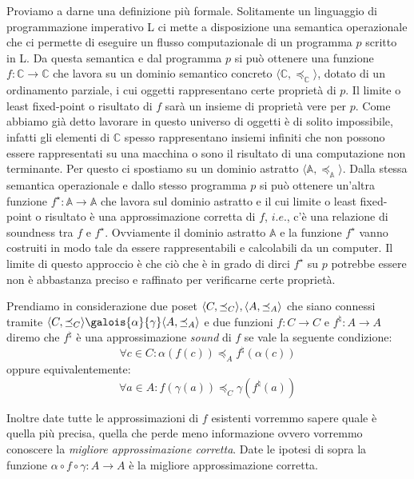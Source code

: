 Proviamo a darne una definizione più formale. Solitamente un linguaggio di programmazione imperativo L ci mette a disposizione una semantica operazionale che ci permette di eseguire un flusso computazionale di un programma \(p\) scritto in L. Da questa semantica e dal programma \(p\) si può ottenere una funzione \(f:\mathbb{C}\rightarrow\mathbb{C}\) che lavora su un dominio semantico concreto \(\langle\mathbb{C}, \preceq_{\mathbb{C}}\rangle\), dotato di un ordinamento parziale, i cui oggetti rappresentano certe proprietà di \(p\). Il limite o least fixed-point o risultato di \(f\) sarà un insieme di proprietà vere per \(p\). Come abbiamo già detto lavorare in questo universo di oggetti è di solito impossibile, infatti gli elementi di \(\mathbb{C}\) spesso rappresentano insiemi infiniti che non possono essere rappresentati su una macchina o sono il risultato di una computazione non terminante. Per questo ci spostiamo su un dominio astratto \(\langle\mathbb{A}, \preceq_{\mathbb{A}}\rangle\). Dalla stessa semantica operazionale e dallo stesso programma \(p\) si può ottenere un'altra funzione \(f^{\star}:\mathbb{A}\rightarrow\mathbb{A}\) che lavora sul dominio astratto e il cui limite o least fixed-point o risultato è una approssimazione corretta di \(f\), \(i.e.\), c'è una relazione di soundness tra \(f\) e \(f^{\star}\). Ovviamente il dominio astratto \(\mathbb{A}\) e la funzione \(f^{\star}\) vanno costruiti in modo tale da essere rappresentabili e calcolabili da un computer. Il limite di questo approccio è che ciò che è in grado di dirci \(f^{\star}\) su \(p\) potrebbe essere non è abbastanza preciso e raffinato per verificarne certe proprietà.
\fi

\begin{definition}[Soundness]
Prendiamo in considerazione due poset \(\langle C, \preceq_{C}\rangle, \langle A, \preceq_{A}\rangle\) che siano connessi tramite \(\simplePoset{C}\galois{\alpha}{\gamma}\simplePoset{A}\) e due funzioni \(f:C\rightarrow C\) e \(f^{\natural}:A\rightarrow A\) diremo che \(f^{\natural}\) è una approssimazione \textit{sound} di \(f\) se vale la seguente condizione:
\[\forall c\in C : \alpha(f(c))\preceq_A f^{\natural}(\alpha(c))\]
oppure equivalentemente:
\[\forall a\in A : f(\gamma(a)) \preceq_C \gamma(f^{\natural}(a))\]

Inoltre date tutte le approssimazioni di \(f\) esistenti vorremmo sapere quale è quella più precisa, quella che perde meno informazione ovvero vorremmo conoscere la \textit{migliore approssimazione corretta}. Date le ipotesi di sopra la funzione \(\alpha\circ f\circ\gamma:A\rightarrow A\) è la migliore approssimazione corretta.
\end{definition}



